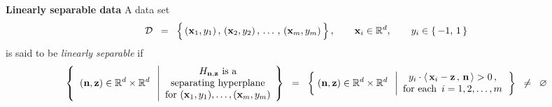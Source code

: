
\vskip 0.8cm
\noindent
\textbf{Linearly separable data}
\vskip 0.1cm
\noindent
A data set
\begin{equation*}
\mathcal{D}
\;\; = \;\;
	\left\{\,
		(\overset{{\color{white}-}}{\mathbf{x}}_{1},y_{1})\,,\,(\mathbf{x}_{2},y_{2})\,,\,\ldots\,,\,(\mathbf{x}_{m},y_{m})
		\,\right\},
\quad\quad
\mathbf{x}_{i} \in \Re^{d},
\quad\quad
y_{i} \in \{\,-1,\,1\,\}
\end{equation*}
is said to be \textit{linearly separable} if
\begin{equation*}
	\left\{\;\;
		(\mathbf{n},\mathbf{z}) \in \mathbb{R}^{d} \times \mathbb{R}^{d}
		\;\;\left\vert
		\begin{array}{c}
			\textnormal{$H_{\mathbf{n},\mathbf{z}}$ is a}
			\\
			\textnormal{separating hyperplane}
			\\
			\textnormal{for $(\mathbf{x}_{1},y_{1}),\ldots,(\mathbf{x}_{m},y_{m})$}
			\end{array}
			\right.
		\!\right\}
\;\; = \;\;
	\left\{\;
		(\mathbf{n},\mathbf{z}) \in \mathbb{R}^{d} \times \mathbb{R}^{d}
		\;\;\left\vert
		\begin{array}{c}
			y_{i}\cdot\langle\,\mathbf{x}_{i} - \mathbf{z}\,,\,\mathbf{n}\,\rangle > 0\,,
			\\
			\textnormal{for each \,$i = 1,2,\ldots,m$}
			\end{array}
			\right.
		\right\}
\;\; \neq \;\;
	\varnothing
\end{equation*}


